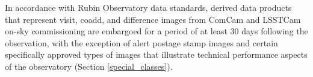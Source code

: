 \documentclass[SE,authoryear,toc]{lsstdoc}
\begin{document}






In accordance with Rubin Observatory data standards, derived data products that represent visit, coadd, and difference images from ComCam and LSSTCam on-sky commissioning are embargoed for a period of at least 30 days following the observation, with the exception of alert postage stamp images and certain specifically approved types of images that illustrate technical performance aspects of the observatory (Section \ref{special_classes}).

\end{document}
